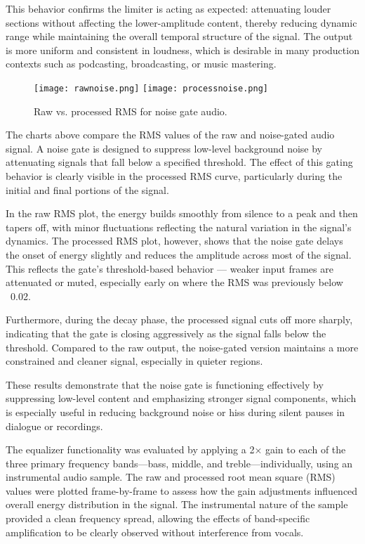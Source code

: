 \documentclass[conference]{IEEEtran}
\begin{document}
This behavior confirms the limiter is acting as expected: attenuating louder sections without affecting the lower-amplitude content, thereby reducing dynamic range while maintaining the overall temporal structure of the signal. The output is more uniform and consistent in loudness, which is desirable in many production contexts such as podcasting, broadcasting, or music mastering.

\begin{figure}[htbp]
    \centering
    \texttt{[image: rawnoise.png]}
    \texttt{[image: processnoise.png]}
    \caption{Raw vs. processed RMS for noise gate audio.}
    \label{fig:figure3}
\end{figure}

The charts above compare the RMS values of the raw and noise-gated audio signal. A noise gate is designed to suppress low-level background noise by attenuating signals that fall below a specified threshold. The effect of this gating behavior is clearly visible in the processed RMS curve, particularly during the initial and final portions of the signal.

In the raw RMS plot, the energy builds smoothly from silence to a peak and then tapers off, with minor fluctuations reflecting the natural variation in the signal’s dynamics. The processed RMS plot, however, shows that the noise gate delays the onset of energy slightly and reduces the amplitude across most of the signal. This reflects the gate’s threshold-based behavior — weaker input frames are attenuated or muted, especially early on where the RMS was previously below ~0.02.

Furthermore, during the decay phase, the processed signal cuts off more sharply, indicating that the gate is closing aggressively as the signal falls below the threshold. Compared to the raw output, the noise-gated version maintains a more constrained and cleaner signal, especially in quieter regions.

These results demonstrate that the noise gate is functioning effectively by suppressing low-level content and emphasizing stronger signal components, which is especially useful in reducing background noise or hiss during silent pauses in dialogue or recordings.

The equalizer functionality was evaluated by applying a 2× gain to each of the three primary frequency bands—bass, middle, and treble—individually, using an instrumental audio sample. The raw and processed root mean square (RMS) values were plotted frame-by-frame to assess how the gain adjustments influenced overall energy distribution in the signal. The instrumental nature of the sample provided a clean frequency spread, allowing the effects of band-specific amplification to be clearly observed without interference from vocals.
\end{document}
